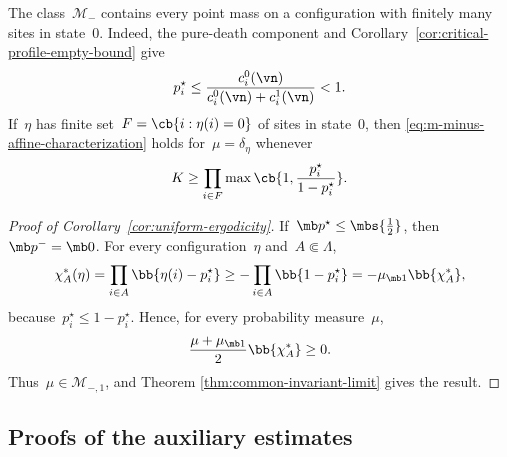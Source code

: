 The class~$\mathcal M_-$ contains every point mass on a configuration with
finitely many sites in state~$0$. Indeed, the pure-death component and
Corollary~\ref{cor:critical-profile-empty-bound} give
\begin{equation*}
p_i^\star
\leq
\frac{c_i^0(\vn)}{c_i^0(\vn)+c_i^1(\vn)}
<1.
\end{equation*}
If~$\eta$ has finite set~$F=\cb{i:\eta(i)=0}$ of sites in state~$0$, then
\eqref{eq:m-minus-affine-characterization} holds for~$\mu=\delta_\eta$ whenever
\begin{equation*}
K
\geq
\prod_{i\in F}
\max\cb{1,\frac{p_i^\star}{1-p_i^\star}}.
\end{equation*}

\begin{proof}[Proof of Corollary~\ref{cor:uniform-ergodicity}]
If~$\mb p^\star\leq\mbs{\tfrac12}$, then~$\mb p^-=\mb 0$. For every
configuration~$\eta$ and~$A\Subset\Lambda$,
\begin{equation*}
\chi_A^*(\eta)
=
\prod_{i\in A}\bb{\eta(i)-p_i^\star}
\geq
-\prod_{i\in A}\bb{1-p_i^\star}
=
-\mu_{\mb 1}\bb{\chi_A^*},
\end{equation*}
because~$p_i^\star\leq1-p_i^\star$. Hence, for every probability
measure~$\mu$,
\begin{equation*}
\frac{\mu+\mu_{\mb 1}}2\bb{\chi_A^*}\geq0.
\end{equation*}
Thus~$\mu\in\mathcal M_{-,1}$, and Theorem
\ref{thm:common-invariant-limit} gives the result.
\end{proof}

\subsection{Proofs of the auxiliary estimates}
\label{subsec:convergence-estimate-proofs}

